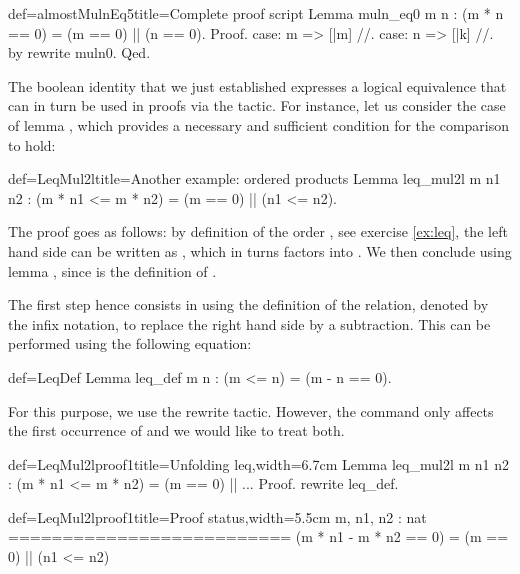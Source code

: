 \begin{coq}{def=almostMulnEq5}{title=Complete proof script}
Lemma muln_eq0 m n : (m * n == 0) = (m == 0) || (n == 0).
Proof.
case: m => [|m] //.
case: n => [|k] //.
by rewrite muln0.
Qed.
\end{coq}



The boolean identity  that we just established expresses a
logical equivalence that can in turn be used in proofs via the
 tactic. For instance, let us consider the case of lemma
, which provides a necessary and sufficient condition
for the comparison  to hold:

\begin{coq}{def=LeqMul2l}{title=Another example: ordered products}
Lemma leq_mul2l m n1 n2 : (m * n1 <= m * n2) = (m == 0) || (n1 <= n2).
\end{coq}

The proof goes as follows: by definition of the order \C{<=}, see exercise
\ref{ex:leq}, the left
hand side can be written as , which in turns
factors into . We then conclude using
lemma , since  is the definition of
.

The first step hence consists in using the definition of the
 relation, denoted by the \C{<=} infix notation, to replace the
right hand side by a subtraction. This can be performed using the
following equation:

\begin{coq}{def=LeqDef}{}
Lemma leq_def m n : (m <= n) = (m - n == 0).
\end{coq}
For this purpose, we use the rewrite tactic. However, the command
 only affects the first occurrence of \C{<=} and we
would like to treat both.

\begin{coq}{def=LeqMul2lproof1}{title=Unfolding leq,width=6.7cm}
Lemma leq_mul2l m n1 n2 :
 (m * n1 <= m * n2) = (m == 0) || ...
Proof.
rewrite leq_def.
\end{coq}
\begin{coqout}{def=LeqMul2lproof1}{title=Proof status,width=5.5cm}
m, n1, n2 : nat
==========================
(m * n1 - m * n2 == 0) =
  (m == 0) || (n1 <= n2)
\end{coqout}

